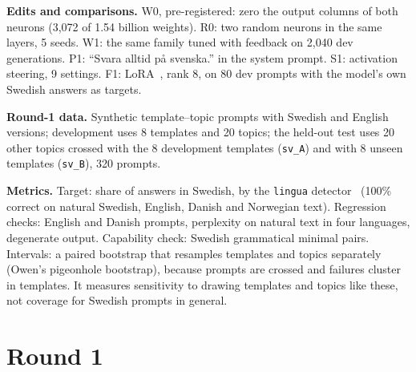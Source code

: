 \documentclass[10pt,a4paper]{article}
\newcommand{\code}[1]{{\small\texttt{#1}}}
\begin{document}
\textbf{Edits and comparisons.} W0, pre-registered: zero the output columns of both neurons (3,072 of 1.54 billion weights). R0: two random neurons in the same layers, 5 seeds.
W1: the same family tuned with feedback on 2,040 dev generations. P1: ``Svara alltid på svenska.'' in the system prompt. S1: activation steering, 9 settings.
F1: LoRA~\cite{hu2021}, rank 8, on 80 dev prompts with the model's own Swedish answers as targets.

\textbf{Round-1 data.} Synthetic template--topic prompts with Swedish and English versions; development uses 8 templates and 20 topics; the held-out test uses 20 other topics crossed with the 8 development templates (\code{sv\_A}) and with 8 unseen templates (\code{sv\_B}), 320 prompts.

\textbf{Metrics.} Target: share of answers in Swedish, by the \code{lingua} detector~\cite{lingua} (100\% correct on natural Swedish, English, Danish and Norwegian text). Regression checks: English and Danish prompts,
perplexity on natural text in four languages, degenerate output. Capability check: Swedish grammatical minimal pairs. Intervals: a paired bootstrap that resamples templates and topics separately (Owen's pigeonhole bootstrap),
because prompts are crossed and failures cluster in templates. It measures sensitivity to drawing templates and topics like these, not coverage for Swedish prompts in general.

\section{Round 1}
\end{document}
